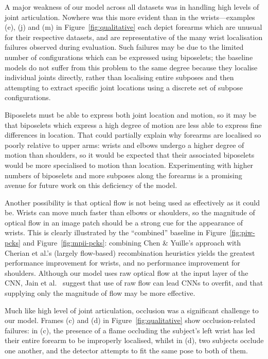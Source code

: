 \documentclass[runningheads]{llncs}
\begin{document}
A major weakness of our model across all datasets was in handling high levels of
joint articulation. Nowhere was this more evident than in the wrists---examples
(e), (j) and (m) in Figure~\ref{fig:qualitative} each depict forearms which are
unusual for their respective datasets, and are representative of the many wrist
localisation failures observed during evaluation. Such failures may be due to
the limited number of configurations which can be expressed using biposelets;
the baseline models do not suffer from this problem to the same degree because
they localise individual joints directly, rather than localising entire subposes
and then attempting to extract specific joint locations using a discrete set of
subpose configurations.

Biposelets must be able to express both joint location and motion, so it may be
that biposelets which express a high degree of motion are less able to express
fine differences in location. That could partially explain why forearms are
localised so poorly relative to upper arms: wrists and elbows undergo a higher
degree of motion than shoulders, so it would be expected that their associated
biposelets would be more specialised to motion than location. Experimenting with
higher numbers of biposelets and more subposes along the forearms is a promising
avenue for future work on this deficiency of the model.

Another possibility is that optical flow is not being used as effectively as it
could be. Wrists can move much faster than elbows or shoulders, so the magnitude
of optical flow in an image patch should be a strong cue for the appearance of
wrists. This is clearly illustrated by the ``combined'' baseline in
Figure~\ref{fig:piw-pcks} and Figure~\ref{fig:mpii-pcks}: combining Chen \&
Yuille's approach with Cherian et al.'s (largely flow-based) recombination
heuristics yields the greatest performance improvement for wrists, and no
performance improvement for shoulders. Although our model uses raw optical flow
at the input layer of the CNN, Jain et al.~\cite{jain2014modeep} suggest that
use of raw flow can lead CNNs to overfit, and that supplying only the magnitude
of flow may be more effective.

Much like high level of joint articulation, occlusion was a significant
challenge to our model. Frames (c) and (d) in Figure~\ref{fig:qualitative} show
occlusion-related failures: in (c), the presence of a flame occluding the
subject's left wrist has led their entire forearm to be improperly localised,
whilst in (d), two subjects occlude one another, and the detector attempts to
fit the same pose to both of them.
\end{document}
